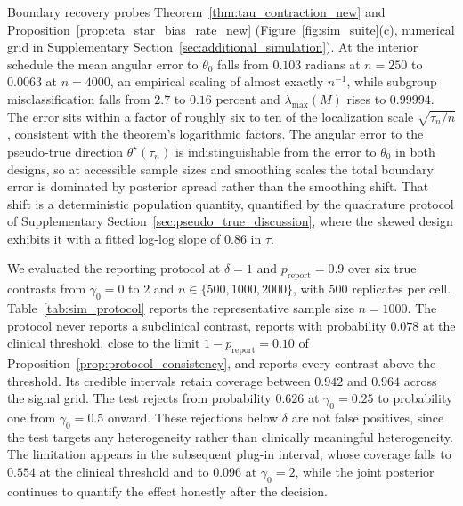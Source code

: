 \documentclass[11pt]{article}
\theoremstyle{definition}
\theoremstyle{plain}
\begin{document}
Boundary recovery probes Theorem~\ref{thm:tau_contraction_new} and Proposition~\ref{prop:eta_star_bias_rate_new} (Figure~\ref{fig:sim_suite}(c), numerical grid in Supplementary Section~\ref{sec:additional_simulation}). At the interior schedule the mean angular error to $\theta_0$ falls from $0.103$ radians at $n=250$ to $0.0063$ at $n=4000$, an empirical scaling of almost exactly $n^{-1}$, while subgroup misclassification falls from $2.7$ to $0.16$ percent and $\lambda_{\max}(M)$ rises to $0.99994$. The error sits within a factor of roughly six to ten of the localization scale $\sqrt{\tau_n/n}$, consistent with the theorem's logarithmic factors. The angular error to the pseudo-true direction $\theta^\star(\tau_n)$ is indistinguishable from the error to $\theta_0$ in both designs, so at accessible sample sizes and smoothing scales the total boundary error is dominated by posterior spread rather than the smoothing shift. That shift is a deterministic population quantity, quantified by the quadrature protocol of Supplementary Section~\ref{sec:pseudo_true_discussion}, where the skewed design exhibits it with a fitted log-log slope of $0.86$ in $\tau$.

We evaluated the reporting protocol at $\delta=1$ and $p_{\mathrm{report}}=0.9$ over six true contrasts from $\gamma_0=0$ to $2$ and $n\in\{500,1000,2000\}$, with $500$ replicates per cell. Table~\ref{tab:sim_protocol} reports the representative sample size $n=1000$. The protocol never reports a subclinical contrast, reports with probability $0.078$ at the clinical threshold, close to the limit $1-p_{\mathrm{report}}=0.10$ of Proposition~\ref{prop:protocol_consistency}, and reports every contrast above the threshold. Its credible intervals retain coverage between $0.942$ and $0.964$ across the signal grid. The \citet{Fan2017} test rejects from probability $0.626$ at $\gamma_0=0.25$ to probability one from $\gamma_0=0.5$ onward. These rejections below $\delta$ are not false positives, since the test targets any heterogeneity rather than clinically meaningful heterogeneity. The limitation appears in the subsequent plug-in interval, whose coverage falls to $0.554$ at the clinical threshold and to $0.096$ at $\gamma_0=2$, while the joint posterior continues to quantify the effect honestly after the decision.
\end{document}

